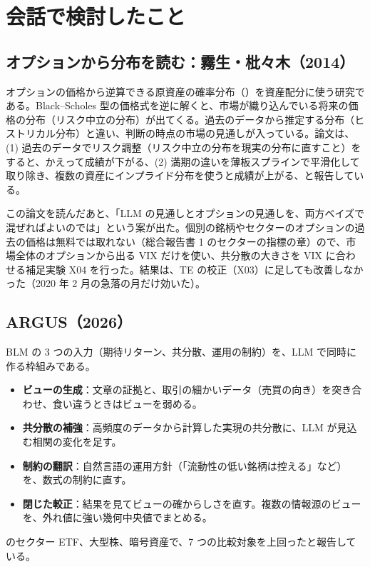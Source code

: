 \section{会話で検討したこと}

\subsection{オプションから分布を読む：霧生・枇々木（2014）}

\begin{paperbox}
オプションの価格から逆算できる原資産の確率分布（）を資産配分に使う研究である。Black--Scholes 型の価格式を逆に解くと、市場が織り込んでいる将来の価格の分布（リスク中立の分布）が出てくる。過去のデータから推定する分布（ヒストリカル分布）と違い、判断の時点の市場の見通しが入っている。論文は、(1) 過去のデータでリスク調整（リスク中立の分布を現実の分布に直すこと）をすると、かえって成績が下がる、(2) 満期の違いを薄板スプラインで平滑化して取り除き、複数の資産にインプライド分布を使うと成績が上がる、と報告している。
\end{paperbox}

この論文を読んだあと、「LLM の見通しとオプションの見通しを、両方ベイズで混ぜればよいのでは」という案が出た。個別の銘柄やセクターのオプションの過去の価格は無料では取れない（総合報告書 1 のセクターの指標の章）ので、市場全体のオプションから出る VIX だけを使い、共分散の大きさを VIX に合わせる補足実験 X04 を行った。結果は、TE の校正（X03）に足しても改善しなかった（2020 年 2 月の急落の月だけ効いた）。

\subsection{ARGUS（2026）}

\begin{paperbox}
BLM の 3 つの入力（期待リターン、共分散、運用の制約）を、LLM で同時に作る枠組みである。
\begin{itemize}
\item \textbf{ビューの生成}：文章の証拠と、取引の細かいデータ（売買の向き）を突き合わせ、食い違うときはビューを弱める。
\item \textbf{共分散の補強}：高頻度のデータから計算した実現の共分散に、LLM が見込む相関の変化を足す。
\item \textbf{制約の翻訳}：自然言語の運用方針（「流動性の低い銘柄は控える」など）を、数式の制約に直す。
\item \textbf{閉じた較正}：結果を見てビューの確からしさを直す。複数の情報源のビューを、外れ値に強い幾何中央値でまとめる。
\end{itemize}
\SP{} のセクター ETF、大型株、暗号資産で、7 つの比較対象を上回ったと報告している。
\end{paperbox}


